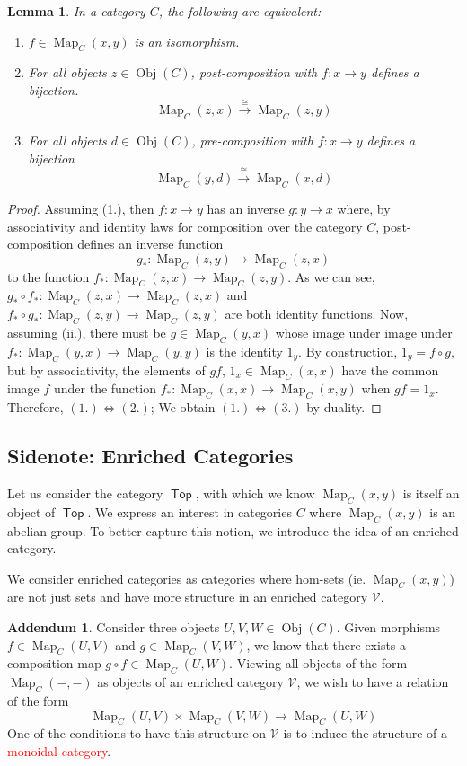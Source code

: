 \documentclass[leqno, openany]{memoir}
\newtheorem{lem}[thm]{Lemma}
\theoremstyle{definition}
\theoremstyle{remark}
\theoremstyle{plain}
\theoremstyle{definition}
\newtheorem*{addm*}{Addendum}
\theoremstyle{remark}
\newcommand{\iso}{\cong}
\DeclareMathOperator{\Top}{\mathsf{Top}}
\DeclareMathOperator{\Obj}{Obj}
\DeclareMathOperator{\Map}{Map}
\begin{document}
\begin{lem}
    In a category $C$, the following are equivalent: 
    \begin{enumerate}
        \item $f \in \Map_C(x,y)$ is an isomorphism.
        \item For all objects $z \in \Obj(C)$, post-composition with $f: x \to y$ defines a bijection.
        \[\Map_C(z,x) \xrightarrow{\iso} \Map_C(z,y)\]
        \item For all objects $d \in \Obj(C)$, pre-composition with $f: x \to y$ defines a bijection 
        \[\Map_C(y,d) \xrightarrow{\iso} \Map_C(x,d)\]
    \end{enumerate}
\end{lem}
\begin{proof}
    Assuming (1.), then $f: x \to y$ has an inverse $g: y \to x$ where, by associativity and identity laws for composition over the category $C$, post-composition defines an inverse function 
    \[g_\ast: \Map_C(z,y) \to \Map_C(z,x)\]
    to the function $f_\ast: \Map_C(z,x) \to \Map_C(z,y)$. As we can see, $g_\ast \circ f_\ast: \Map_C(z,x) \to \Map_C(z,x)$ and $f_\ast \circ g_\ast: \Map_C(z,y) \to \Map_C(z,y)$ are both identity functions. Now, assuming (ii.), there must be $g\in \Map_C(y,x)$ whose image under image under $f_\ast: \Map_C(y,x) \to \Map_C(y,y)$ is the identity $1_y$. By construction, $1_y = f\circ  g$, but by associativity, the elements of $gf$, $1_x \in \Map_C(x,x)$ have the common image $f$ under the function $f_\ast: \Map_C(x,x) \to \Map_C(x,y)$ when $gf = 1_x$. Therefore, $(1.) \iff (2.)$; We obtain $(1.) \iff (3.)$ by duality.
\end{proof}

\subsection{Sidenote: Enriched Categories}
Let us consider the category $\Top$, with which we know $\Map_C(x,y)$ is itself an object of $\Top$. We express an interest in categories $C$ where $\Map_C(x,y)$ is an abelian group. To better capture this notion, we introduce the idea of an enriched category.

We consider enriched categories as categories where hom-sets (ie. $\Map_C(x,y)$) are not just sets and have more structure in an enriched category $\mathcal{V}$.
\begin{addm*}
    Consider three objects $U,V,W \in \Obj(C)$. Given morphisms $f \in \Map_C(U,V)$ and $g \in \Map_C(V,W)$, we know that there exists a composition map $g \circ f \in \Map_C(U,W)$. Viewing all objects of the form $\Map_C(-,-)$ as objects of an enriched category $\mathcal{V}$, we wish to have a relation of the form 
\[\Map_C(U,V) \times \Map_C(V,W) \to \Map_C(U,W)\]
One of the conditions to have this structure on $\mathcal{V}$ is to induce the structure of a \textcolor{red}{monoidal category}.
\end{addm*}
\end{document}
